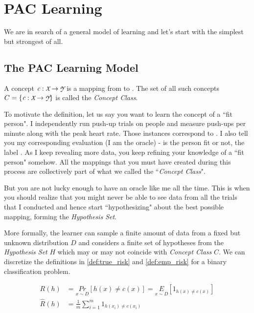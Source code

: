 \documentclass[../toml]{subfiles}
\begin{document}
\chapter{PAC Learning}

We are in search of a general model of learning and let's start with the simplest but
strongest of all.

\section{The PAC Learning Model}

\begin{definition} \label{def:concept_class}
A concept $\textit{c}: \cursive{X} \to \cursive{Y}$ is a mapping from  to
. The set of all such concepts $C = \{\textit{c}: \cursive{X} \to \cursive{Y}\}$
is called the \textit{Concept Class}.
\end{definition}

To motivate the definition, let us say you want to learn the concept of a ``fit person". I
independently run push-up trials on people and measure push-ups per minute along
with the peak heart rate. Those instances correspond to . I also tell you
my corresponding evaluation (I am the oracle) - is the person fit or not, the label
. As I keep revealing more data, you keep refining your knowledge of a
``fit person" somehow. All the mappings that you must have created during this process
are collectively part of what we called the ``\textit{Concept Class}".

But you are not lucky enough to have an oracle like me all the time. This is when you
should realize that you might never be able to see data from all the trials that I conducted
and hence start ``hypothesizing" about the best possible mapping, forming the \textit{Hypothesis Set}.

More formally, the learner can sample a finite amount of data from a fixed but unknown
distribution $D$ and considers a finite set of hypotheses from the \textit{Hypothesis Set}
$H$ which may or may not coincide with \textit{Concept Class} $C$. We can discretize
the definitions in \ref{def:true_risk} and \ref{def:emp_risk} for a binary classification
problem.

\begin{align}
R(h) &= \underset{x \sim D}{Pr}[h(x) \neq c(x)] = \underset{x \sim D}{E}[1_{h(x) \neq c(x)}] \nonumber \\
\hat{R}(h) &= \frac{1}{m} \sum_{i=1}^{m} 1_{h(x_i) \neq c(x_i)}
\end{align}
\end{document}
